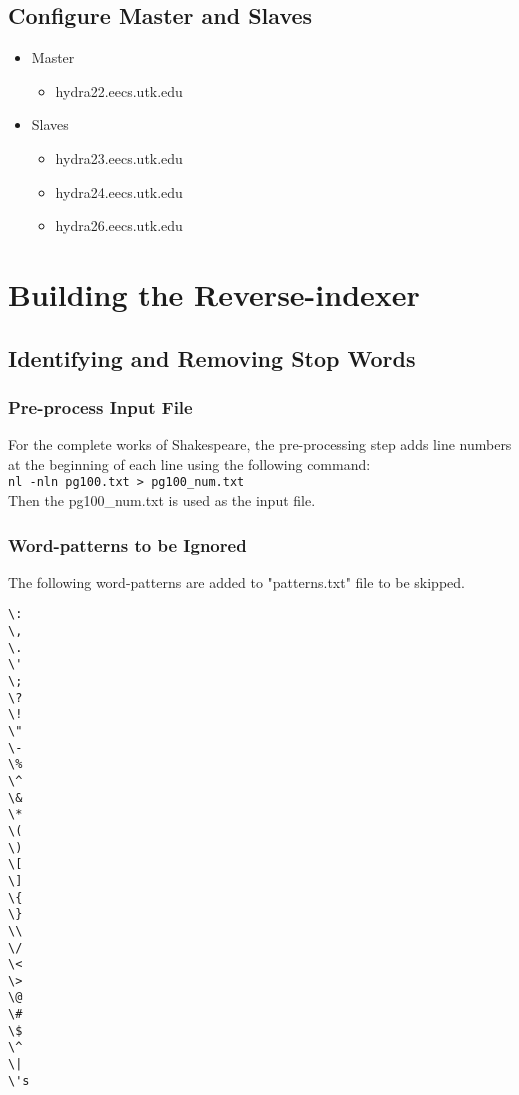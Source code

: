 \documentclass[12pt]{article}
\begin{document}
\subsection{Configure Master and Slaves}
\begin{itemize}
\item Master
    \begin{itemize}
    \item hydra22.eecs.utk.edu
    \end{itemize}
\item Slaves
    \begin{itemize}
        \item hydra23.eecs.utk.edu
        \item hydra24.eecs.utk.edu
        \item hydra26.eecs.utk.edu
    \end{itemize}
\end{itemize}
 
\section{Building the Reverse-indexer}
\subsection{Identifying and Removing Stop Words}
\subsubsection{Pre-process Input File}
For the complete works of Shakespeare, the pre-processing step adds line numbers at the beginning 
of each line using the following command:\\
\verb+nl -nln pg100.txt > pg100_num.txt+\\
Then the pg100\_num.txt is used as the input file.

\subsubsection{Word-patterns to be Ignored}
The following word-patterns are added to "patterns.txt" file to be skipped.
\begin{verbatim}
\:
\, 
\.
\'
\;
\?
\!
\"
\-
\%
\^
\&
\*
\(
\)
\[
\]
\{
\}
\\
\/
\<
\>
\@
\#
\$
\^
\|
\'s
\end{verbatim}
\end{document}
